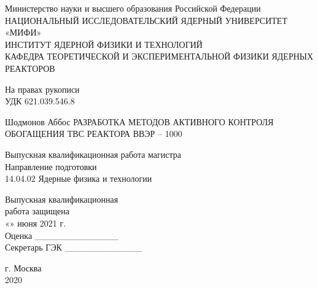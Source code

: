 \documentclass[14pt]{article}
\begin{document}
	\begin{titlepage}
		\begin{center}
			\large	Министерство науки и высшего образования Российской Федерации\\ НАЦИОНАЛЬНЫЙ ИССЛЕДОВАТЕЛЬСКИЙ ЯДЕРНЫЙ УНИВЕРСИТЕТ «МИФИ»\\
			ИНСТИТУТ ЯДЕРНОЙ ФИЗИКИ И ТЕХНОЛОГИЙ\\КАФЕДРА ТЕОРЕТИЧЕСКОЙ И ЭКСПЕРИМЕНТАЛЬНОЙ ФИЗИКИ ЯДЕРНЫХ РЕАКТОРОВ
			\vspace{0.25cm}
			
			
			\begin{flushright}
			\small{На правах рукописи}\\
           \small{ УДК 621.039.546.8}
			\end{flushright}
			\vfill
			
			\Huge Шодмонов Аббос
			\vfill
			{\Large РАЗРАБОТКА МЕТОДОВ АКТИВНОГО КОНТРОЛЯ ОБОГАЩЕНИЯ ТВС РЕАКТОРА ВВЭР – 1000\\
			}
			\bigskip
		\end{center}
	
		\begin{center} Выпускная квалификационная работа магистра\\
        Направление подготовки\\
         14.04.02 Ядерные физика и технологии
         \end{center}
         
         \vfill
         
         \begin{flushright}
                 Выпускная квалификационная\\
работа защищена\\
«» июня 2021 г.\\
Оценка \_\_\_\_\_\_\_\_\_\_\_\_\_ \\
Секретарь ГЭК \_\_\_\_\_\_\_\_\_\_\_\_ 
         \end{flushright}
		\vfill
		
		
		\begin{center}
			г. Москва\\ 2020
		\end{center}
	\end{titlepage}
	\newpage
	\renewcommand{\contentsname}{Содержание}
	\tableofcontents
	\newpage
\end{document}
